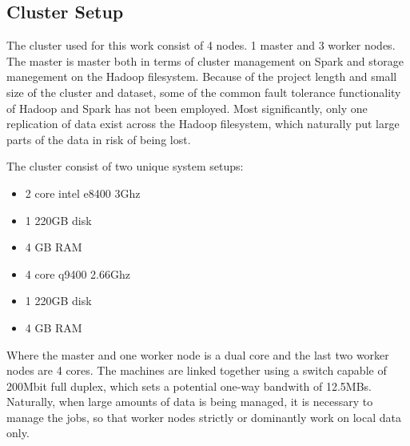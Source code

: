 \subsection{Cluster Setup}

The cluster used for this work consist of 4 nodes. 1 master and 3 worker nodes. The master is master both in terms of cluster management on Spark and storage manegement on the Hadoop filesystem. Because of the project length and small size of the cluster and dataset,  some of the common fault tolerance functionality of Hadoop and Spark has not been employed. Most significantly, only one replication of data exist across the Hadoop filesystem, which naturally put large parts of the data in risk of being lost. 

The cluster consist of two unique system setups:

\begin{itemize}
\item 2 core intel e8400 3Ghz
\item  1 220GB disk
\item   4 GB RAM
\end{itemize}

\begin{itemize}
\item 4 core q9400 2.66Ghz
\item 1 220GB disk
\item 4 GB RAM
\end{itemize}

Where the master and one worker node is a dual core and the last two worker nodes are 4 cores. The machines are linked together using a switch capable of 200Mbit full duplex, which sets a potential one-way bandwith of 12.5MBs. Naturally, when large amounts of data is being managed, it is necessary to manage the jobs, so that worker nodes strictly or dominantly work on local data only.